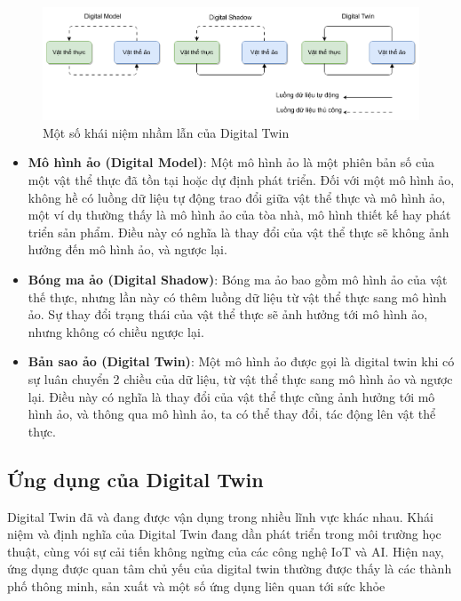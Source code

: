 \begin{figure}[!h]
    \centering
    \includegraphics[width=1\textwidth]{Images/Methodologies/digital_twin_classification.png}
    \caption{Một số khái niệm nhầm lẫn của Digital Twin}
\end{figure}

\begin{itemize}
    \item \textbf{Mô hình ảo (Digital Model)}: Một mô hình ảo là một phiên bản số của một vật thể thực đã tồn tại hoặc dự định phát triển. Đối với một mô hình ảo, không hề có luồng dữ liệu tự động trao đổi giữa vật thể thực và mô hình ảo, một ví dụ thường thấy là mô hình ảo của tòa nhà, mô hình thiết kế hay phát triển sản phẩm. Điều này có nghĩa là thay đổi của vật thể thực sẽ không ảnh hưởng đến mô hình ảo, và ngược lại.
    \item \textbf{Bóng ma ảo (Digital Shadow)}: Bóng ma ảo bao gồm mô hình ảo của vật thế thực, nhưng lần này có thêm luồng dữ liệu từ vật thể thực sang mô hình ảo. Sự thay đổi trạng thái của vật thể thực sẽ ảnh hưởng tới mô hình ảo, nhưng không có chiều ngược lại.
    \item \textbf{Bản sao ảo (Digital Twin)}: Một mô hình ảo được gọi là digital twin khi có sự luân chuyển 2 chiều của dữ liệu, từ vật thể thực sang mô hình ảo và ngược lại. Điều này có nghĩa là thay đổi của vật thể thực cũng ảnh hưởng tới mô hình ảo, và thông qua mô hình ảo, ta có thể thay đổi, tác động lên vật thể thực.
\end{itemize}

\subsection{Ứng dụng của Digital Twin}

Digital Twin đã và đang được vận dụng trong nhiều lĩnh vực khác nhau. Khái niệm và định nghĩa của Digital Twin đang dần phát triển trong môi trường học thuật, cùng vói sự cải tiến không ngừng của các công nghệ IoT và AI. Hiện nay, ứng dụng được quan tâm chủ yếu của digital twin thường được thấy là các thành phố thông minh, sản xuất và một số ứng dụng liên quan tới sức khỏe \cite{fuller_dt_tech_challenge_research}

